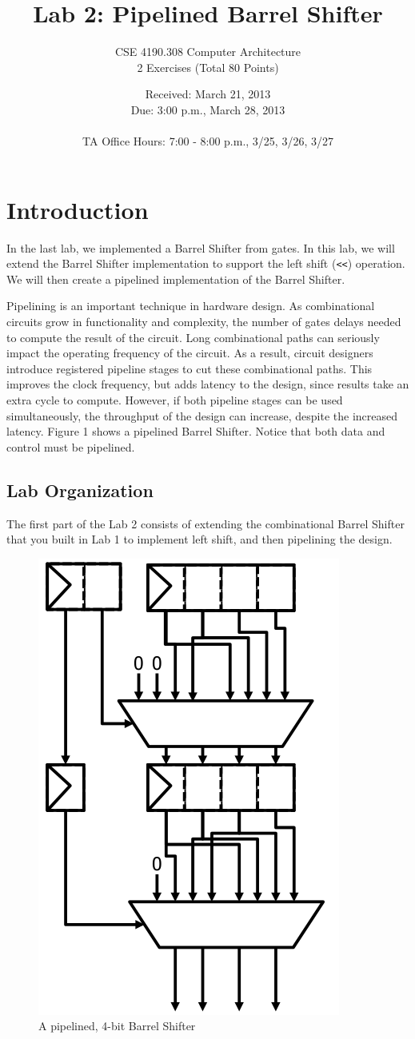 \documentclass{article}
\begin{document}
\title{Lab 2: Pipelined Barrel Shifter}   %
\author{CSE 4190.308 Computer Architecture \\ 2 Exercises (Total 80 Points)}
\date{Received: March 21, 2013 \\Due: 3:00 p.m., March 28, 2013\\ \ \\ TA Office Hours: 7:00 - 8:00 p.m., 3/25, 3/26, 3/27} 
\maketitle

\section{Introduction}
In the last lab, we implemented a Barrel Shifter from gates. 
In this lab, we will extend the Barrel Shifter implementation to support the left shift (\texttt{<<}) operation. 
We will then create a pipelined implementation of the Barrel Shifter.

Pipelining is an important technique in hardware design. 
As combinational circuits grow in functionality and complexity, 
the number of gates delays needed to compute the result of the circuit.
Long combinational paths can seriously impact the operating frequency of the circuit. 
As a result, circuit designers introduce registered pipeline stages to cut these combinational paths. 
This improves the clock frequency, but adds latency to the design, since results take an extra cycle to compute.
However, if both pipeline stages can be used simultaneously, the throughput of the design can increase, despite the increased latency. 
Figure 1 shows a pipelined Barrel Shifter. Notice that both data and control must be pipelined.

\subsection{Lab Organization}
The first part of the Lab 2 consists of extending the combinational Barrel Shifter 
that you built in Lab 1 to implement left shift, and then pipelining the design.

\begin{figure}[hb]
	\centering
	\includegraphics[width=0.3\linewidth]{pipeBS.png}
	\caption{A pipelined, 4-bit Barrel Shifter}
	\label{fig:pipelined_brs}
\end{figure}
\end{document}
